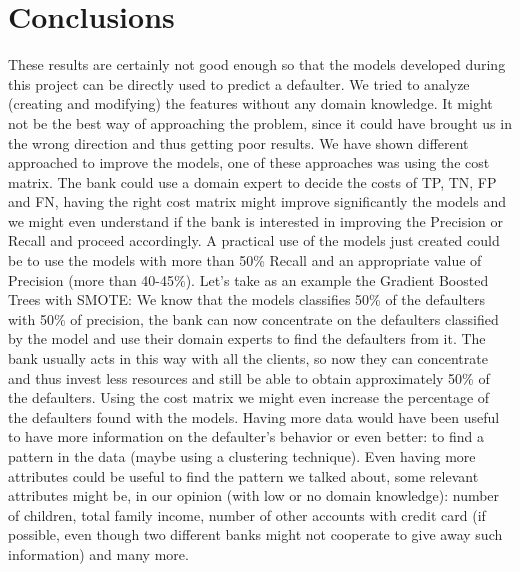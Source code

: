 \documentclass[fleqn,10pt]{SelfArx} %
\begin{document}
\section{Conclusions}
These results are certainly not good enough so that the models developed during this project can be directly used to predict a defaulter. 
We tried to analyze (creating and modifying) the features without any domain knowledge. 
It might not be the best way of approaching the problem, since it could have brought us in the wrong direction and thus getting poor results.\newline
We have shown different approached to improve the models, one of these approaches was using the cost matrix. The bank could use a domain expert to decide the costs of TP, TN, FP and FN, having the right cost matrix might improve significantly the models and we might even understand if the bank is interested in improving the Precision or Recall and proceed accordingly.\newline
A practical use of the models just created could be to use the models with more than 50\% Recall and an appropriate value of Precision (more than 40-45\%). 
Let's take as an example the Gradient Boosted Trees with SMOTE: We know that the models classifies 50\% of the defaulters with 50\% of precision, the bank can now concentrate on the defaulters classified by the model and use their domain experts to find the defaulters from it. 
The bank usually acts in this way with all the clients, so now they can concentrate and thus invest less resources and still be able to obtain approximately 50\% of the defaulters.
Using the cost matrix we might even increase the percentage of the defaulters found with the models.\newline
Having more data would have been useful to have more information on the defaulter's behavior or even better: to find a pattern in the data (maybe using a clustering technique). Even having more attributes could be useful to find the pattern we talked about, some relevant attributes might be, in our opinion (with low or no domain knowledge): number of children, total family income, number of other accounts with credit card (if possible, even though two different banks might not cooperate to give away such information) and many more.
\end{document}
